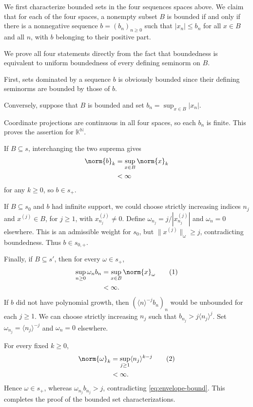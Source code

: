 \documentclass[10pt]{mypackage}
\begin{document}
We first characterize bounded sets in the four sequences spaces above. We claim that for each of the four spaces, a nonempty subset \(B\) is bounded if and only if there is a nonnegative sequence \(b=\left(b_n\right)_{n\geq 0}\) such that \(|x_n|\le b_n\) for all \(x\in B\) and all \(n\), with \(b\) belonging to their positive part.

We prove all four statements directly from the fact that boundedness is equivalent to uniform boundedness of every defining seminorm on \(B\).

First, sets dominated by a sequence \(b\) is obviously bounded since their defining seminorms are bounded by those of $b$.

Conversely, suppose that \(B\) is bounded and set \(b_n=\sup_{x\in B}\left\vert x_n \right\vert\).

Coordinate projections are continuous in all four spaces, so each \(b_n\) is finite. This proves the assertion for \(\mathbb{K}^{\mathbb{N}}\).

If \(B\subseteq s\), interchanging the two suprema gives
\begin{align*}
  \norm{b}_k & =\sup_{x\in B}\norm{x}_k\\
             &<\infty 
\end{align*}
for any $k\geq 0$, so \(b\in s_+\).

If \(B\subseteq s_0\) and \(b\) had infinite support, we could choose strictly increasing indices \(n_j\) and \(x^{(j)}\in B\), for \(j\ge1\), with \(x^{(j)}_{n_j}\ne0\). Define \(\omega_{n_j}=j/|x^{(j)}_{n_j}|\) and \(\omega_n=0\) elsewhere. This is an admissible weight for \(s_0\), but \(\|x^{(j)}\|_\omega\ge j\), contradicting boundedness. Thus \(b\in s_{0,+}\).

Finally, if \(B\subseteq s'\), then for every \(\omega\in s_+\),
\begin{align*}
  \sup_{n\ge0}\omega_nb_n &=\sup_{x\in B}\norm{x}_\omega\label{eq:envelope-bound}\tag{1}\\
                          &<\infty.
\end{align*}
If \(b\) did not have polynomial growth, then \(\left(\langle n\rangle^{-j}b_n\right)_n\) would be unbounded for each \(j\ge1\). We can choose strictly increasing \(n_j\) such that \(b_{n_j}>j\langle n_j\rangle^j\). Set \(\omega_{n_j}=\langle n_j\rangle^{-j}\) and \(\omega_n=0\) elsewhere.

For every fixed \(k\ge0\),
\begin{align*}
  \norm{\omega}_k &=\sup_{j\ge1}\langle n_j\rangle^{k-j}\label{eq:sparse-weight}\tag{2}\\
                  &<\infty.
\end{align*}
Hence \(\omega\in s_+\), whereas \(\omega_{n_j}b_{n_j}>j\), contradicting \eqref{eq:envelope-bound}. This completes the proof of the bounded set characterizations.
\end{document}
